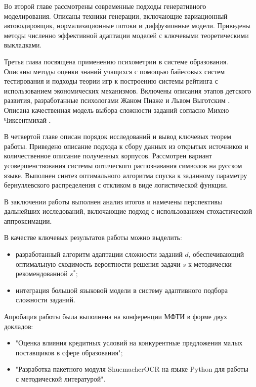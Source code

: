 Во второй главе  рассмотрены современные подходы генеративного моделирования. Описаны техники 
генерации, включающие вариационный автокодировщик, нормализационные потоки и диффузионные модели. Приведены 
методы численно эффективной адаптации моделей  с ключевыми теоретическими выкладками.

Третья глава посвящена применению психометрии в системе образования. Описаны методы 
оценки знаний учащихся с помощью байесовых систем тестирования и подходы теории игр к построению системы рейтинга 
с использованием экономических механизмов. Включены описания этапов детского развития, разработанные психологами Жаном Пиаже \cite{piaget1952origins} и Львом Выготским \cite{выготский2014мышление}.
Описана качественная модель выбора сложности заданий согласно Михею Чиксентмихай \cite{chen2007flow}.

В четвертой главе описан порядок исследований и вывод ключевых теорем работы. Приведено описание подхода к сбору данных из открытых источников и количественное
описание полученных корпусов. Рассмотрен вариант усовершенствования системы оптического распознавания символов на русском языке. Выполнен синтез 
оптимального алгоритма спуска к заданному параметру бернуллевского распределения с откликом в виде логистической функции. 

В заключении работы выполнен анализ итогов и намечены перспективы дальнейших исследований, включающие подход с использованием
 стохастической аппроксимации.

В качестве ключевых результатов работы можно выделить: \begin{itemize}
    \item разработанный алгоритм адаптации сложности заданий $d$, обеспечивающий оптимальную сходимость вероятности решения задачи $s$ к методически рекомендованной $s^*$;
    \item интеграция большой языковой модели в систему адаптивного подбора сложности заданий.
\end{itemize}

Апробация работы была выполнена на конференции МФТИ в форме двух докладов: \begin{itemize}
    \item "Оценка влияния кредитных условий на конкурентные предложения малых поставщиков в сфере образования";
    \item "Разработка пакетного модуля ShuemacherOCR на языке Python для работы с методической литературой".
\end{itemize}
